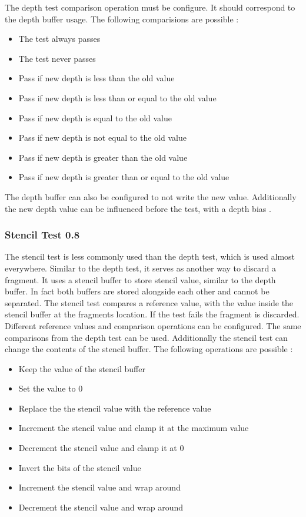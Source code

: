 The depth test comparison operation must be configure. It should correspond to the depth buffer usage. The following comparisions are possible \cite{sellers:vulkanprogramming}:
\begin{itemize}
	\item The test always passes
	\item The test never passes
	\item Pass if new depth is less than the old value
	\item Pass if new depth is less than or equal to  the old value
	\item Pass if new depth is equal to the old value
	\item Pass if new depth is not equal to the old value
	\item Pass if new depth is greater than the old value
	\item Pass if new depth is greater than or equal to  the old value	
\end{itemize}

The depth buffer can also be configured to not write the new value. Additionally the new depth value can be influenced before the test, with a depth bias \cite{sellers:vulkanprogramming}.

\subsubsection{Stencil Test 0.8}
\label{section:stenciltest}

The stencil test is less commonly used than the depth test, which is used almost everywhere. Similar to the depth test, it serves as another way to discard a fragment. It uses a stencil buffer to store stencil value, similar to the depth buffer. In fact both buffers are stored alongside each other and cannot be separated. The stencil test compares a reference value, with the value inside the stencil buffer at the fragments location. If the test fails the fragment is discarded. Different reference values and comparison operations can be configured. The same comparisons from the depth test can be used. Additionally the stencil test can change the contents of the stencil buffer. The following operations are possible \cite{sellers:vulkanprogramming}:
\begin{itemize}
	\item Keep the value of the stencil buffer
	\item Set the value to 0
	\item Replace the the stencil value with the reference value
	\item Increment the stencil value and clamp it at the maximum value
	\item Decrement the stencil value and clamp it at 0
	\item Invert the bits of the stencil value
	\item Increment the stencil value and wrap around
	\item Decrement the stencil value and wrap around	
\end{itemize}

